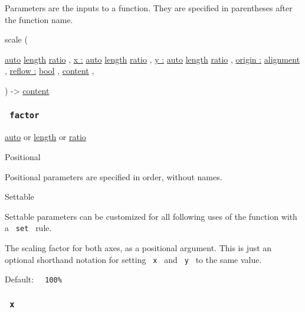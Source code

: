 \label{parameters-tooltip}
Parameters are the inputs to a function. They are specified in
parentheses after the function name.

{ scale } (

{ \hyperref[parameters-factor]{}
\href{/docs/reference/foundations/auto/}{auto}
\href{/docs/reference/layout/length/}{length}
\href{/docs/reference/layout/ratio/}{ratio} , } {
\hyperref[parameters-x]{x :}
\href{/docs/reference/foundations/auto/}{auto}
\href{/docs/reference/layout/length/}{length}
\href{/docs/reference/layout/ratio/}{ratio} , } {
\hyperref[parameters-y]{y :}
\href{/docs/reference/foundations/auto/}{auto}
\href{/docs/reference/layout/length/}{length}
\href{/docs/reference/layout/ratio/}{ratio} , } {
\hyperref[parameters-origin]{origin :}
\href{/docs/reference/layout/alignment/}{alignment} , } {
\hyperref[parameters-reflow]{reflow :}
\href{/docs/reference/foundations/bool/}{bool} , } {
\href{/docs/reference/foundations/content/}{content} , }

) -\textgreater{} \href{/docs/reference/foundations/content/}{content}

\subsubsection{\texorpdfstring{\texttt{\ factor\ }}{ factor }}\label{parameters-factor}

\href{/docs/reference/foundations/auto/}{auto} {or}
\href{/docs/reference/layout/length/}{length} {or}
\href{/docs/reference/layout/ratio/}{ratio}

{{ Positional }}

\label{parameters-factor-positional-tooltip}
Positional parameters are specified in order, without names.

{{ Settable }}

\label{parameters-factor-settable-tooltip}
Settable parameters can be customized for all following uses of the
function with a \texttt{\ set\ } rule.

The scaling factor for both axes, as a positional argument. This is just
an optional shorthand notation for setting \texttt{\ x\ } and
\texttt{\ y\ } to the same value.

Default: \texttt{\ }{\texttt{\ 100\%\ }}\texttt{\ }

\subsubsection{\texorpdfstring{\texttt{\ x\ }}{ x }}\label{parameters-x}

